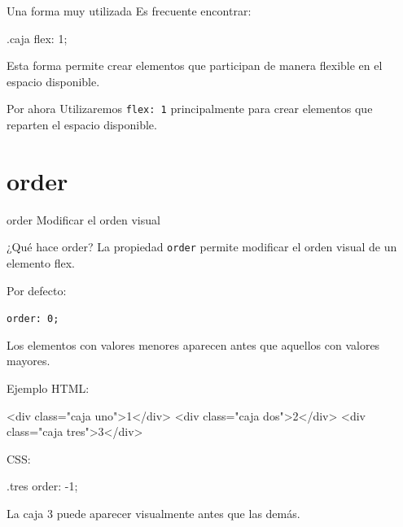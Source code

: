 \documentclass[aspectratio=169,11.5pt]{beamer}
\begin{document}
    \begin{frame}[fragile]{Una forma muy utilizada}
        Es frecuente encontrar:

        \begin{csscodedark}
            .caja {
                flex: 1;
            }
        \end{csscodedark}

        Esta forma permite crear elementos
        que participan de manera flexible
        en el espacio disponible.

        \begin{alertblock}{Por ahora}
            Utilizaremos \texttt{flex: 1}
            principalmente para crear elementos
            que reparten el espacio disponible.
        \end{alertblock}
    \end{frame}



    \section{order}

    \SectionSlide
    {order}
    {Modificar el orden visual}

    \begin{frame}{¿Qué hace order?}
        La propiedad \texttt{order} permite modificar
        el orden visual de un elemento flex.

        Por defecto:

        \begin{center}
            \texttt{order: 0;}
        \end{center}

        Los elementos con valores menores
        aparecen antes que aquellos
        con valores mayores.
    \end{frame}

    \begin{frame}[fragile]{Ejemplo}
        HTML:

        \begin{htmlcodedark}
            <div class="caja uno">1</div>
            <div class="caja dos">2</div>
            <div class="caja tres">3</div>
        \end{htmlcodedark}

        CSS:

        \begin{csscodedark}
            .tres {
                order: -1;
            }
        \end{csscodedark}

        La caja 3 puede aparecer visualmente
        antes que las demás.
    \end{frame}
\end{document}
